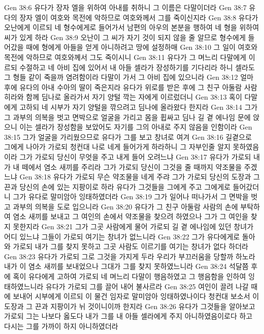 Gen 38:6  유다가 장자 엘을 위하여 아내를 취하니 그 이름은 다말이더라
Gen 38:7  유다의 장자 엘이 여호와 목전에 악하므로 여호와께서 그를 죽이신지라
Gen 38:8  유다가 오난에게 이르되 네 형수에게로 들어가서 남편의 아우의 본분을 행하여 네 형을 위하여 씨가 있게 하라
Gen 38:9  오난이 그 씨가 자기 것이 되지 않을 줄 알므로 형수에게 들어갔을 때에 형에게 아들을 얻게 아니하려고 땅에 설정하매
Gen 38:10  그 일이 여호와 목전에 악하므로 여호와께서 그도 죽이시니
Gen 38:11  유다가 그 며느리 다말에게 이르되 수절하고 네 아비 집에 있어서 내 아들 셀라가 장성하기를 기다리라 하니 셀라도 그 형들 같이 죽을까 염려함이라 다말이 가서 그 아비 집에 있으니라
Gen 38:12  얼마 후에 유다의 아내 수아의 딸이 죽은지라 유다가 위로를 받은 후에 그 친구 아둘람 사람 히라와 함께 딤나로 올라가서 자기 양털 깍는 자에게 이르렀더니
Gen 38:13  혹이 다말에게 고하되 네 시부가 자기 양털을 깎으려고 딤나에 올라왔다 한지라
Gen 38:14  그가 그 과부의 의복을 벗고 면박으로 얼굴을 가리고 몸을 휩싸고 딤나 길 곁 에나임 문에 앉으니 이는 셀라가 장성함을 보았어도 자기를 그의 아내로 주지 않음을 인함이라
Gen 38:15  그가 얼굴을 가리웠으므로 유다가 그를 보고 창녀로 여겨
Gen 38:16  길곁으로 그에게 나아가 가로되 청컨대 나로 네게 들어가게 하라하니 그 자부인줄 알지 못하였음이라 그가 가로되 당신이 무엇을 주고 내게 들어 오려느냐
Gen 38:17  유다가 가로되 내가 내 떼에서 염소 새끼를 주리라 그가 가로되 당신이 그것을 줄 때까지 약조물을 주겠느냐
Gen 38:18  유다가 가로되 무슨 약조물을 네게 주랴 그가 가로되 당신의 도장과 그 끈과 당신의 손에 있는 지팡이로 하라 유다가 그것들을 그에게 주고 그에게로 들어갔더니 그가 유다로 말미암아 잉태하였더라
Gen 38:19  그가 일어나 떠나가서 그 면박을 벗고 과부의 의복을 도로 입으니라
Gen 38:20  유다가 그 친구 아둘람 사람의 손에 부탁하여 염소 새끼를 보내고 그 여인의 손에서 약조물을 찾으려 하였으나 그가 그 여인을 찾지 못한지라
Gen 38:21  그가 그곳 사람에게 물어 가로되 길 곁 에나임에 있던 창녀가 어디 있느냐 그들이 가로되 여기는 창녀가 없느니라
Gen 38:22  그가 유다에게로 돌아와 가로되 내가 그를 찾지 못하고 그곳 사람도 이르기를 여기는 창녀가 없다 하더라
Gen 38:23  유다가 가로되 그로 그것을 가지게 두라 우리가 부끄러움을 당할까 하노라 내가 이 염소 새끼를 보내었으나 그대가 그를 찾지 못하였느니라
Gen 38:24  석달쯤 후에 혹이 유다에게 고하여 가로되 네 며느리 다말이 행음하였고 그 행음함을 인하여 잉태하였느니라 유다가 가로되 그를 끌어 내어 불사르라
Gen 38:25  여인이 끌려 나갈 때에 보내어 시부에게 이르되 이 물건 임자로 말미암아 잉태하였나이다 청컨대 보소서 이 도장과 그 끈과 지팡이가 뉘 것이니이까 한지라
Gen 38:26  유다가 그것들을 알아보고 가로되 그는 나보다 옳도다 내가 그를 내 아들 셀라에게 주지 아니하였음이로다 하고 다시는 그를 가까이 하지 아니하였더라
